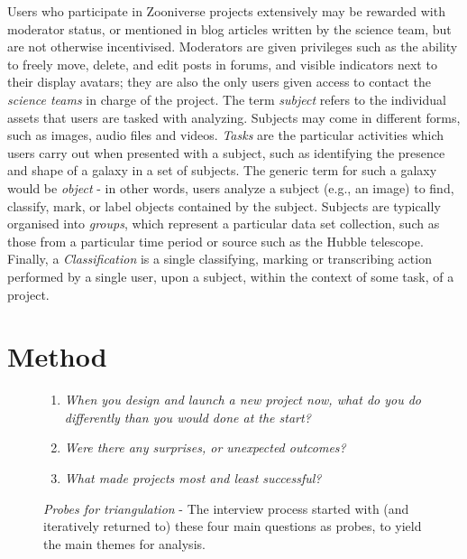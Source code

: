 \documentclass{sigchi}
\begin{document}
Users who participate in Zooniverse projects extensively may be rewarded with moderator status, or mentioned in blog articles written by the science team, but are not otherwise incentivised.  Moderators are given privileges such as the ability to freely move, delete, and edit posts in forums, and visible indicators next to their display avatars; they are also the only users given access to contact the \emph{science teams} in charge of the project. The term \emph{subject} refers to the individual assets that users are tasked with analyzing.  Subjects may come in different forms, such as images, audio files and videos. \emph{Tasks} are the particular activities which users carry out when presented with a subject, such as identifying the presence and shape of a galaxy in a set of subjects. The generic term for such a galaxy would be \emph{object} - in other words, users analyze a subject (e.g., an image) to find, classify, mark, or label objects contained by the subject. Subjects are typically organised into \emph{groups}, which represent a particular data set collection, such as those from a particular time period or source such as the Hubble telescope.  Finally, a \emph{Classification} is a single classifying, marking or transcribing action performed by a single user, upon a subject, within the context of some task, of a project.


\section{Method}

\begin{figure}[tbp]
\begin{center}
\begin{enumerate}[itemsep=1mm]
\item \emph{When you design and launch a new project now, what do you do differently than you would done at the start?}
\item \emph{Were there any surprises, or unexpected outcomes?}
\item \emph{What made projects most and least successful?}
\end{enumerate}
\vspace{10pt}
\caption{\emph{Probes for triangulation} - The interview process started with (and iteratively returned to) these four main questions as probes, to yield the main themes for analysis.}
\label{tbl:questions}
\end{center}
\vspace{-18pt}
\end{figure}
\end{document}
